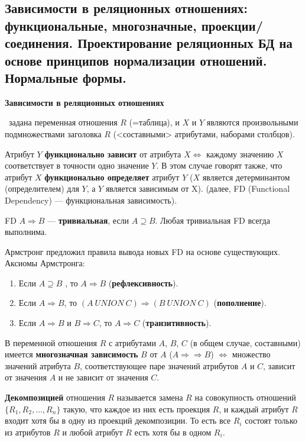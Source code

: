 \subsection{Зависимости  в  реляционных  отношениях:  функциональные,  многозначные,  проекции/соединения. Проектирование реляционных БД на основе принципов нормализации отношений. Нормальные формы.}

\textbf{Зависимости в реляционных отношениях}

\mathLet \ задана переменная отношения $R$ (=таблица), и $X$ и $Y$ являются произвольными подмножествами заголовка $R$ (<составными> атрибутами, наборами столбцов).

Атрибут $Y$ \textbf{функционально зависит} от атрибута $X \iff$ каждому значению $X$ соответствует в точности одно значение $Y$.
В этом случае говорят также, что атрибут $X$ \textbf{функционально определяет} атрибут $Y$ ($X$ является детерминантом (определителем) для $Y$, а $Y$ является зависимым от X). (далее, FD (Functional Dependency) --- функциональная зависимость).

FD $A \Rightarrow B$ --- \textbf{тривиальная}, если $A \supseteq B$. 
Любая тривиальная FD всегда выполнима.

Армстронг предложил правила вывода новых FD на основе существующих.
Аксиомы Армстронга:
\begin{enumerate}
    \item Если $A \supseteq B$ , то $A \Rightarrow B$ (\textbf{рефлексивность}).
    \item Если $A \Rightarrow B$, то $(A~UNION~C) \Rightarrow (B~UNION~C)$ (\textbf{пополнение}).
    \item Если $A \Rightarrow B$ и $B \Rightarrow C$, то $A \Rightarrow C$ (\textbf{транзитивность}).
\end{enumerate}


В переменной отношения $R$ с атрибутами $A$, $B$, $C$ (в общем случае, составными) имеется \textbf{многозначная зависимость} $B$ от $A$ ($A \Rightarrow\Rightarrow B$) $\iff$ множество значений атрибута $B$, соответствующее паре значений атрибутов $A$ и $C$, зависит от значения $A$ и не зависит от значения $C$.

\textbf{Декомпозицией} отношения $R$ называется замена $R$ на совокупность отношений $\{R_1, R_2, \dots , R_n\}$ такую, что каждое из них есть проекция $R$, и каждый атрибут $R$ входит хотя бы в одну из проекций декомпозиции.
То есть все $R_i$ состоят только из атрибутов $R$ и любой атрибут $R$ есть хотя бы в одном $R_i$.

